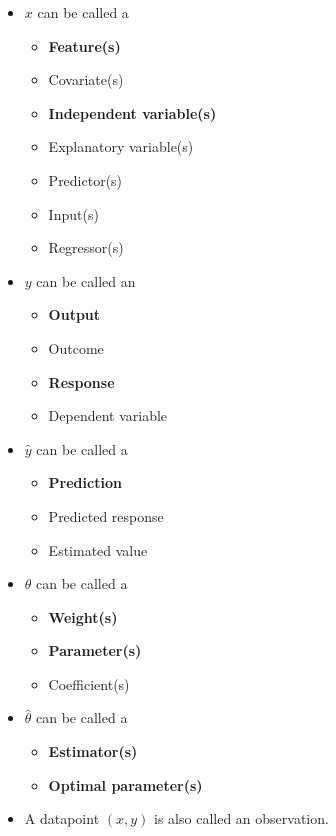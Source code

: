 \documentclass[
  letterpaper,
  DIV=11,
  numbers=noendperiod]{scrreprt}
\providecommand{\tightlist}{%
  \setlength{\itemsep}{0pt}\setlength{\parskip}{0pt}}\usepackage{longtable,booktabs,array}
\begin{document}
\begin{itemize}
\tightlist
\item
  \(x\) can be called a

  \begin{itemize}
  \tightlist
  \item
    \textbf{Feature(s)}
  \item
    Covariate(s)
  \item
    \textbf{Independent variable(s)}
  \item
    Explanatory variable(s)
  \item
    Predictor(s)
  \item
    Input(s)
  \item
    Regressor(s)
  \end{itemize}
\item
  \(y\) can be called an

  \begin{itemize}
  \tightlist
  \item
    \textbf{Output}
  \item
    Outcome
  \item
    \textbf{Response}
  \item
    Dependent variable
  \end{itemize}
\item
  \(\hat{y}\) can be called a

  \begin{itemize}
  \tightlist
  \item
    \textbf{Prediction}
  \item
    Predicted response
  \item
    Estimated value
  \end{itemize}
\item
  \(\theta\) can be called a

  \begin{itemize}
  \tightlist
  \item
    \textbf{Weight(s)}
  \item
    \textbf{Parameter(s)}
  \item
    Coefficient(s)
  \end{itemize}
\item
  \(\hat{\theta}\) can be called a

  \begin{itemize}
  \tightlist
  \item
    \textbf{Estimator(s)}
  \item
    \textbf{Optimal parameter(s)}
  \end{itemize}
\item
  A datapoint \((x, y)\) is also called an observation.
\end{itemize}
\end{document}
